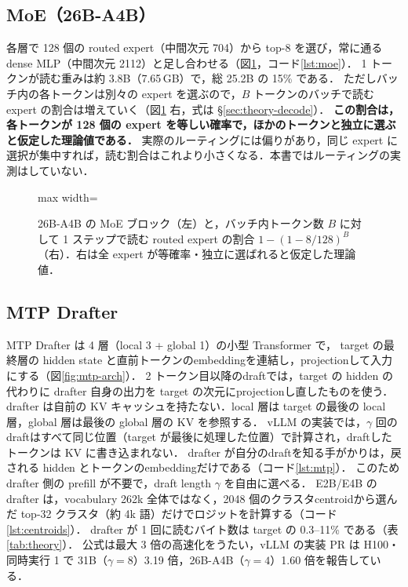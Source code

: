 \documentclass[a4paper,10pt]{ltjsarticle}
\begin{document}


\subsection{MoE（26B-A4B）}
各層で 128 個の routed expert（中間次元 704）から top-8 を選び，常に通る dense MLP（中間次元 2112）と足し合わせる（図\ref{fig:moe}，コード\ref{lst:moe}）．
1 トークンが読む重みは約 3.8B（7.65\,GB）で，総 25.2B の 15\% である．
ただしバッチ内の各トークンは別々の expert を選ぶので，$B$ トークンのバッチで読む expert の割合は増えていく（図\ref{fig:moe} 右，式は \S\ref{sec:theory-decode}）．
\textbf{この割合は，各トークンが 128 個の expert を等しい確率で，ほかのトークンと独立に選ぶと仮定した理論値である．}
実際のルーティングには偏りがあり，同じ expert に選択が集中すれば，読む割合はこれより小さくなる．本書ではルーティングの実測はしていない．

\begin{figure}[htbp]\centering
\begin{adjustbox}{max width=\linewidth}\end{adjustbox}
\caption{26B-A4B の MoE ブロック（左）と，バッチ内トークン数 $B$ に対して 1 ステップで読む routed expert の割合 $1-(1-8/128)^B$（右）．右は全 expert が等確率・独立に選ばれると仮定した理論値．}
\label{fig:moe}
\end{figure}



\subsection{MTP Drafter}
MTP Drafter は 4 層（local 3 + global 1）の小型 Transformer で，
target の最終層の hidden state と直前トークンのembeddingを連結し，projectionして入力にする（図\ref{fig:mtp-arch}）．
2 トークン目以降のdraftでは，target の hidden の代わりに drafter 自身の出力を target の次元にprojectionし直したものを使う．
drafter は自前の KV キャッシュを持たない．local 層は target の最後の local 層，global 層は最後の global 層の KV を参照する．
vLLM の実装では，$\gamma$ 回のdraftはすべて同じ位置（target が最後に処理した位置）で計算され，draftしたトークンは KV に書き込まれない．
drafter が自分のdraftを知る手がかりは，戻される hidden とトークンのembeddingだけである（コード\ref{lst:mtp}）．
このため drafter 側の prefill が不要で，draft length $\gamma$ を自由に選べる．
E2B/E4B の drafter は，vocabulary 262k 全体ではなく，2048 個のクラスタcentroidから選んだ top-32 クラスタ（約 4k 語）だけでロジットを計算する（コード\ref{lst:centroids}）．
drafter が 1 回に読むバイト数は target の 0.3--11\% である（表\ref{tab:theory}）．
公式は最大 3 倍の高速化をうたい，vLLM の実装 PR\cite{vllmpr} は H100・同時実行 1 で 31B（$\gamma=8$）3.19 倍，26B-A4B（$\gamma=4$）1.60 倍を報告している．
\end{document}
